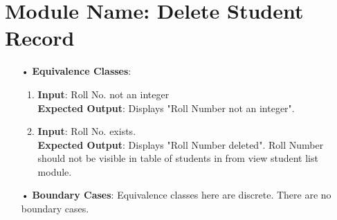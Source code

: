 \documentclass{scrreprt}
\begin{document}
\section{Module Name: Delete Student Record}
\begin{itemize}
\item[•]\textbf{Equivalence Classes}:
\begin{enumerate}
\item \textbf{Input}: Roll No. not an integer\\
\textbf{Expected Output}: Displays "Roll Number not an integer".
\item \textbf{Input}: Roll No. exists.\\
\textbf{Expected Output}: Displays "Roll Number deleted". Roll Number should not be visible in table of students in from view student list module. 
\end{enumerate}
\item[•]\textbf{Boundary Cases}: Equivalence classes here are discrete. There are no boundary cases.
\end{itemize}
\end{document}
